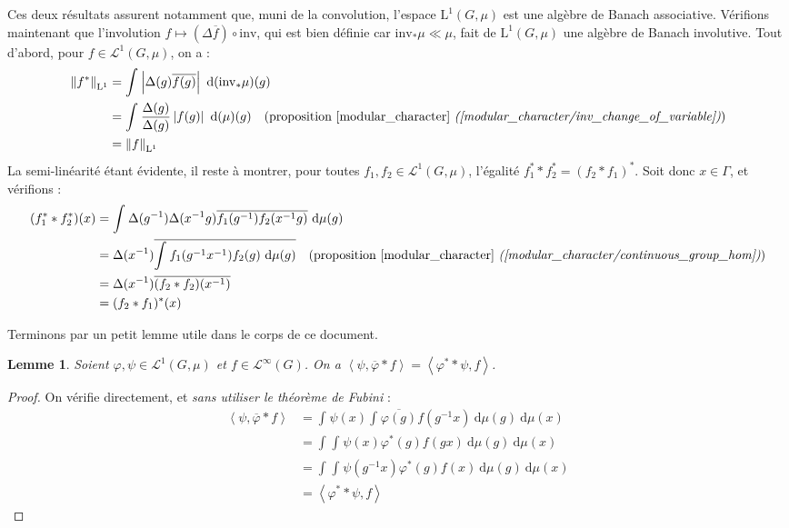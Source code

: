 \documentclass[a4paper,12pt]{article}
\newtheorem{lemma}[theorem]{Lemme}
\newcommand{\norm}[1]{\left\Vert #1\right\Vert}
\newcommand{\abs}[1]{\left\vert#1\right\vert}
\newcommand{\ket}[1]{\left\langle #1 \right\rangle}
\newcommand{\integral}[4]{\int_{#1}^{#2} #3~\mathrm{d}#4}
\newcommand{\inv}{^{-1}}
\newcommand{\comp}{\circ}
\newcommand{\invop}{\mathrm{inv}}
\begin{document}
Ces deux résultats assurent notamment que, muni de la convolution, l'espace $\mathrm{L}^1(G, \mu)$
est une algèbre de Banach associative. Vérifions maintenant que l'involution $f\mapsto(\Delta\overline{f})\comp\invop$, qui est bien définie car 
$\invop_*\mu\ll\mu$, fait de $\mathrm{L}^1(G, \mu)$ une algèbre de Banach involutive. Tout d'abord, pour $f\in\mathscr{L}^1(G, \mu)$, on a : 
\begin{align*}
    \norm{f^*}_{\mathrm{L}^1} 
        &= \integral{}{}{\abs{\Delta(g)\overline{f(g)}}}{(\invop_*\mu)(g)} \\
        &= \integral{}{}{\frac{\Delta(g)}{\Delta(g)}\abs{f(g)}}{(\mu)(g)} \quad\text{(proposition \ref{modular_character} \textit{(\ref{modular_character/inv_change_of_variable})})}\\
        &= \norm{f}_{\mathrm{L}^1}
\end{align*}
La semi-linéarité étant évidente, il reste à montrer, pour toutes $f_1, f_2\in\mathscr{L}^1(G, \mu)$, l'égalité $f_1^*\ast f_2^* = (f_2\ast f_1)^*$. Soit donc $x\in\Gamma$, et vérifions :
\begin{align*}
    (f_1^*\ast f_2^*)(x) 
        &= \integral{}{}{\Delta(g\inv)\Delta(x\inv g)\overline{f_1(g\inv) f_2(x\inv g)}}{\mu(g)} \\
        &= \Delta(x\inv)\overline{\integral{}{}{f_1(g\inv x\inv) f_2(g)}{\mu(g)}} \quad\text{(proposition \ref{modular_character} \textit{(\ref{modular_character/continuous_group_hom})})}\\
        &= \Delta(x\inv)\overline{(f_2\ast f_2)(x\inv)} \\
        &= (f_2\ast f_1)^*(x)
\end{align*}

Terminons par un petit lemme utile dans le corps de ce document. 

\begin{lemma}\label{ket_conv}
    Soient $\varphi, \psi\in\mathscr{L}^1(G, \mu)$ et $f\in\mathscr{L}^\infty(G)$. 
    On a $\ket{\psi, \overline{\varphi}\ast f} = \ket{\varphi^*\ast\psi, f}$.
\end{lemma}

\begin{proof}
    On vérifie directement, et \emph{sans utiliser le théorème de Fubini} :
    \begin{align*}
        \ket{\psi, \overline{\varphi}\ast f} 
            &= \integral{}{}{\psi(x)\integral{}{}{\overline{\varphi(g)}f(g\inv x)}{\mu(g)}}{\mu(x)} \\
            &= \integral{}{}{\integral{}{}{\psi(x)\varphi^*(g)f(g x)}{\mu(g)}}{\mu(x)} \\
            &= \integral{}{}{\integral{}{}{\psi(g\inv x)\varphi^*(g)f(x)}{\mu(g)}}{\mu(x)} \\
            &= \ket{\varphi^*\ast\psi, f} 
    \end{align*}
\end{proof}
\end{document}
